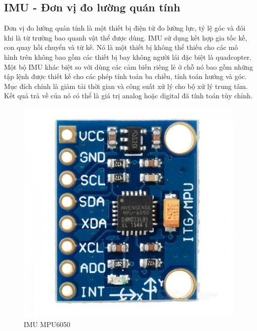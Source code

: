     \subsection{IMU - Đơn vị đo lường quán tính}
    Đơn vị đo lường quán tính là một thiết bị điện tử đo lường lực, tỷ lệ góc và đôi khi là từ trường bao quanh vật thể được dùng. IMU sử dụng kết hợp gia tốc kế, con quay hồi chuyển và từ kế. Nó là một thiết bị không thể thiếu cho các mô hình trên không bao gồm các thiết bị bay không người lái đặc biệt là quadcopter.\\
    Một bộ IMU khác biệt so với dùng các cảm biến riêng lẻ ở chỗ nó bao gồm những tập lệnh được thiết kế cho các phép tính toán ba chiều, tính toán hướng và góc. Mục đích chính là giảm tải thời gian và công suất xử lý cho bộ xử lý trung tâm. Kết quả trả về của nó có thể là giá trị analog hoặc digital đã tính toán tùy chỉnh.
    
    \begin{figure}[h!]
    	\begin{center}
    		\includegraphics[scale=0.25]{images/mpu6050.jpg}
    		\caption{IMU MPU6050}
    	\end{center}
    \end{figure}
    
